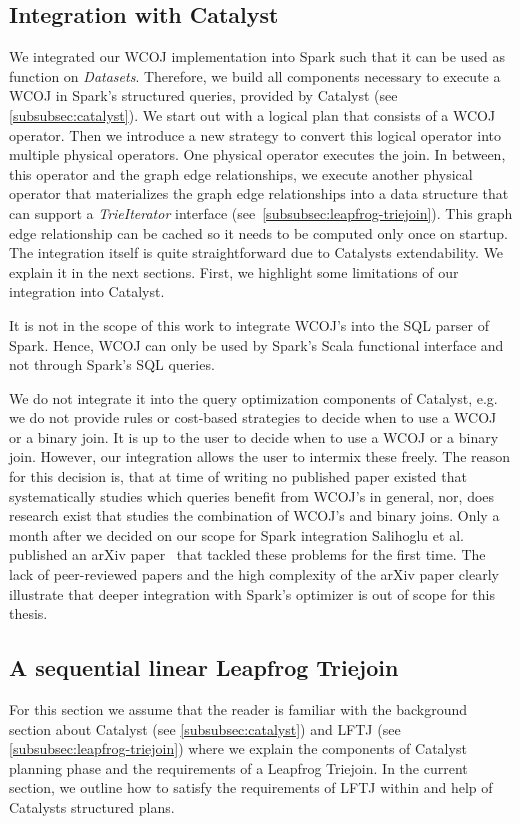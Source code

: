 \subsection{Integration with Catalyst} \label{ssec:integration-with-catalyst}
We integrated our WCOJ implementation into Spark such that it can be used as function on \textit{Datasets}.
Therefore, we build all components necessary to execute a WCOJ in Spark's structured queries, provided by Catalyst (see
\cref{subsubsec:catalyst}).
We start out with a logical plan that consists of a \textsc{WCOJ} operator.
Then we introduce a new strategy to convert this logical operator into multiple physical operators.
One physical operator executes the join.
In between, this operator and the graph edge relationships, we execute another physical operator that materializes
the graph edge relationships into a data structure that can support a \textit{TrieIterator} interface
(see~\cref{subsubsec:leapfrog-triejoin}).
This graph edge relationship can be cached so it needs to be computed only once on startup.
The integration itself is quite straightforward due to Catalysts extendability.
We explain it in the next sections.
First, we highlight some limitations of our integration into Catalyst.

It is not in the scope of this work to integrate WCOJ's into the SQL parser of Spark.
Hence, WCOJ can only be used by Spark's Scala functional interface and not through Spark's SQL queries.

We do not integrate it into the query optimization components of Catalyst, e.g. we do not provide rules or cost-based strategies to
decide when to use a WCOJ or a binary join.
It is up to the user to decide when to use a WCOJ or a binary join.
However, our integration allows the user to intermix these freely.
The reason for this decision is, that at time of writing no published paper existed that systematically studies which queries benefit from
WCOJ's in general, nor, does research exist that studies the combination of WCOJ's and binary joins.
Only a month after we decided on our scope for Spark integration Salihoglu et al. published an arXiv paper~\cite{mhedhbi2019} that
tackled these problems for the first time.
The lack of peer-reviewed papers and the high complexity of the arXiv paper clearly illustrate that deeper integration with
Spark's optimizer is out of scope for this thesis.

\subsection{A sequential linear Leapfrog Triejoin} \label{subsec:spark-integration-seq}
For this section we assume that the reader is familiar with the background section about Catalyst (see \cref{subsubsec:catalyst}) and
\textsc{LFTJ} (see \cref{subsubsec:leapfrog-triejoin}) where we explain the components of Catalyst planning phase and the requirements
of a Leapfrog Triejoin.
In the current section, we outline how to satisfy the requirements of \textsc{LFTJ} within and help of Catalysts structured plans.

